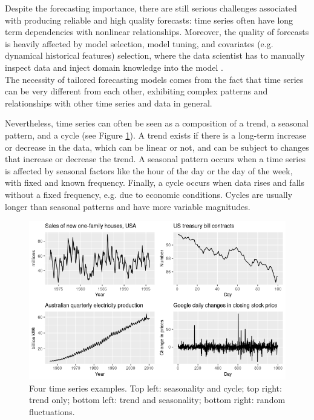 \documentclass[a4paper, 12pt]{article} %
\begin{document}
	Despite the forecasting importance, there are still serious challenges associated with producing reliable and high quality forecasts: time series often have long term dependencies with nonlinear relationships.  Moreover, the quality of forecasts is heavily affected by model selection, model tuning, and covariates (e.g. dynamical historical features) selection, where the data scientist has to manually inspect data and inject domain knowledge into the model \cite{DeepLearningForecastingSurvey, FacebookProphet}.\\
	The necessity of tailored forecasting models comes from the fact that time series can be very different from each other, exhibiting complex patterns and relationships with other time series and data in general. 
	
	Nevertheless, time series can often be seen as a composition of a trend, a seasonal pattern, and a cycle \cite{ForecastingHyndmanAthanasopoulos} (see Figure \ref{fig:time_series_components}).
	A trend exists if there is a long-term increase or decrease in the data, which can be linear or not, and can be subject to changes that increase or decrease the trend.
	A seasonal pattern occurs when a time series is affected by seasonal factors like the hour of the day or the day of the week, with fixed and known frequency.
	Finally, a cycle occurs when data rises and falls without a fixed frequency, e.g. due to economic conditions.  Cycles are usually longer than seasonal patterns and have more variable magnitudes.
	
	\begin{figure}
		\includegraphics[width=\linewidth]{img/sota_ts_components.png}
		\caption{Four time series examples. Top left: seasonality and cycle; top right: trend only; bottom left: trend and seasonality; bottom right: random fluctuations.}
		\label{fig:time_series_components}
	\end{figure}
	
\end{document}
